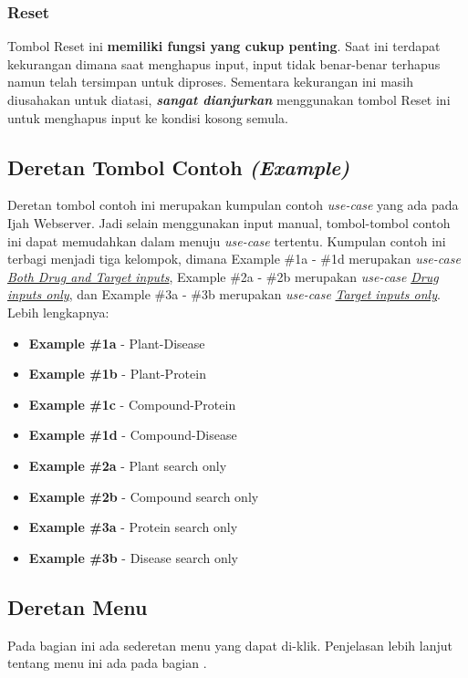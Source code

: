 		\subsubsection{Reset} \label{reset}
		Tombol Reset ini \textbf{memiliki fungsi yang cukup penting}. Saat ini terdapat kekurangan dimana saat menghapus input, input tidak benar-benar terhapus namun telah tersimpan untuk diproses. Sementara kekurangan ini masih diusahakan untuk diatasi, \textbf{\emph{sangat dianjurkan}} menggunakan tombol Reset ini untuk menghapus input ke kondisi kosong semula.

	\subsection{Deretan Tombol Contoh \emph{(Example)}} \label{example button}
	Deretan tombol contoh ini merupakan kumpulan contoh \emph{use-case} yang ada pada Ijah Webserver. Jadi selain menggunakan input manual, tombol-tombol contoh ini dapat memudahkan dalam menuju \emph{use-case} tertentu. Kumpulan contoh ini terbagi menjadi tiga kelompok, dimana Example \#1a - \#1d merupakan \emph{use-case} \hyperref[end to end]{\emph{Both Drug and Target inputs}}, Example \#2a - \#2b merupakan \emph{use-case} \hyperref[drug only]{\emph{Drug inputs only}}, dan Example \#3a - \#3b merupakan \emph{use-case} \hyperref[target only]{\emph{Target inputs only}}. Lebih lengkapnya:

	\begin{itemize}
	\item \textbf{Example \#1a} - Plant-Disease
	\item \textbf{Example \#1b} - Plant-Protein
	\item \textbf{Example \#1c} - Compound-Protein
	\item \textbf{Example \#1d} - Compound-Disease
	\item \textbf{Example \#2a} - Plant search only
	\item \textbf{Example \#2b} - Compound search only
	\item \textbf{Example \#3a} - Protein search only
	\item \textbf{Example \#3b} - Disease search only
	\end{itemize}

	\subsection{Deretan Menu} \label{menu list}
	Pada bagian ini ada sederetan menu yang dapat di-klik. Penjelasan lebih lanjut tentang menu ini ada pada bagian \textbf{}.

